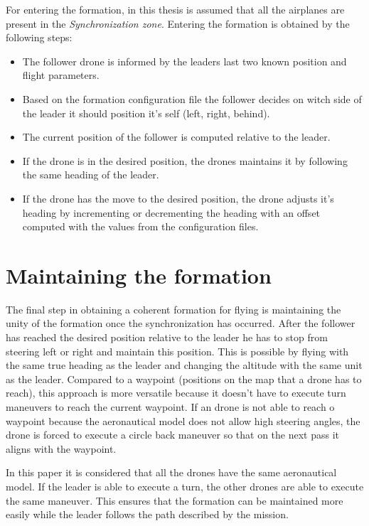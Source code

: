 \newpage

For entering the formation, in this thesis is assumed that all the airplanes are
present in the \textit {Synchronization zone}. Entering the formation is obtained
by the following steps:

\begin {itemize}
\item The follower drone is informed by the leaders last two known position and flight
parameters.
\item Based on the formation configuration file the follower decides on witch side
of the leader it should position it's self (left, right, behind).
\item The current position of the follower is computed relative to the leader.
\item If the drone is in the desired position, the drones maintains it 
by following the same heading of the leader.
\item If the drone has the move to the desired position, the drone adjusts it's
heading by incrementing or decrementing the heading with an offset computed
with the values from the configuration files.
\end {itemize}

\section{Maintaining the formation}
\label{sec:formation-maintainig}
The final step in obtaining a coherent formation for flying is maintaining
the unity of the formation once the synchronization has occurred. After
the follower has reached the desired position relative to the leader
he has to stop from steering left or right and maintain this position. This
is possible by flying with the same true heading as the leader and changing the
altitude with the same unit as the leader. Compared to a waypoint (positions on
the map that a drone has to reach), this approach is more versatile
because it doesn't have to execute turn maneuvers to reach the current waypoint.
If an drone is not able to reach o waypoint because the aeronautical model
does not allow high steering angles, the drone is forced to execute a 
circle back maneuver so that on the next pass it aligns with the waypoint. 

In this paper it is considered that all the drones have the same aeronautical model.
If the leader is able to execute a turn, the other drones are able to execute
the same maneuver. This ensures that the formation can be maintained
more easily while the leader follows the path described by the mission. 

